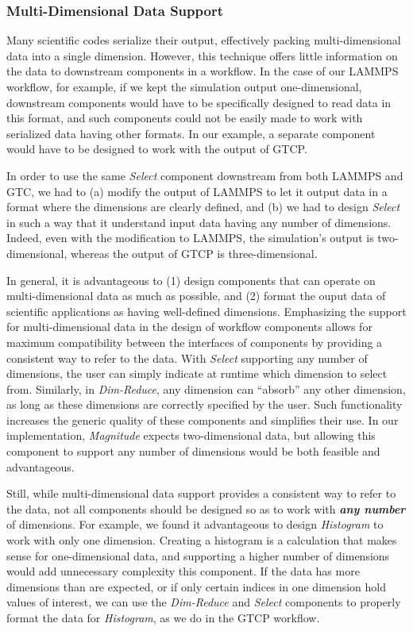 \documentclass[conference]{IEEEtran}
\begin{document}
\subsubsection{Multi-Dimensional Data Support}

Many scientific codes serialize their output, effectively packing
multi-dimensional data into a single dimension. However, this technique offers
little information on the data to downstream components in a workflow. In the
case of our LAMMPS workflow, for example, if we kept the simulation output
one-dimensional, downstream components would have to be specifically designed
to read data in this format, and such components could not be easily made to
work with serialized data having other formats. In our example, a separate
component would have to be designed to work with the output of GTCP.

In order to use the same {\em Select} component downstream from both LAMMPS and
GTC, we had to (a) modify the output of LAMMPS to let it output data in a
format where the dimensions are clearly defined, and (b) we had to design {\em
Select} in such a way that it understand input data having any number of
dimensions.  Indeed, even with the modification to LAMMPS, the simulation’s
output is two-dimensional, whereas the output of GTCP is three-dimensional.

In general, it is advantageous to (1) design components that can operate on
multi-dimensional data as much as possible, and (2) format the ouput data of
scientific applications as having well-defined dimensions. Emphasizing the
support for multi-dimensional data in the design of workflow components allows
for maximum compatibility between the interfaces of components by providing a
consistent way to refer to the data. With {\em Select} supporting any number of
dimensions, the user can simply indicate at runtime which dimension to select
from. Similarly, in {\em Dim-Reduce}, any dimension can ``absorb'' any other
dimension, as long as these dimensions are correctly specified by the user.
Such functionality increases the generic quality of these components and
simplifies their use. In our implementation, {\em Magnitude} expects
two-dimensional data, but allowing this component to support any number of
dimensions would be both feasible and advantageous.

Still, while multi-dimensional data support provides a consistent way to refer
to the data, not all components should be designed so as to work with
\textbf{\em any number} of dimensions. For example, we found it advantageous to
design {\em Histogram} to work with only one dimension. Creating a histogram is
a calculation that makes sense for one-dimensional data, and supporting a
higher number of dimensions would add unnecessary complexity this component. If
the data has more dimensions than are expected, or if only certain indices in
one dimension hold values of interest, we can use the {\em Dim-Reduce} and {\em
Select} components to properly format the data for {\em Histogram}, as we do in
the GTCP workflow.
\end{document}
